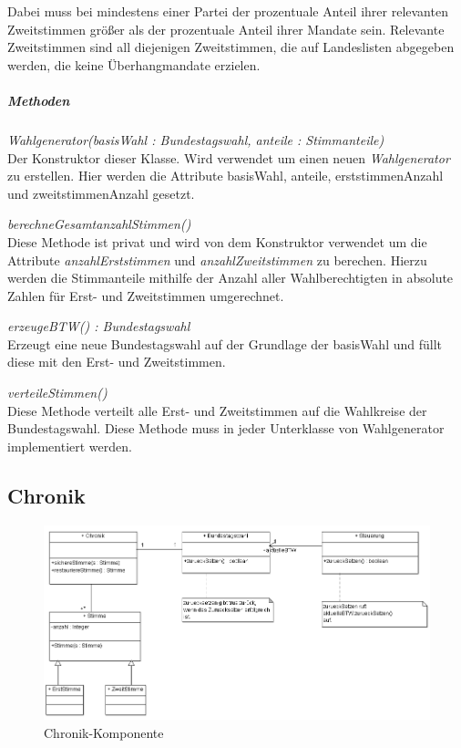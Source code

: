 \documentclass[12pt,a4paper,titlepage]{article}
\newcommand{\mymo}{\fontfamily{pcr}\selectfont \textit}
\begin{document}
Dabei muss bei mindestens einer Partei der prozentuale Anteil ihrer relevanten Zweitstimmen größer als der prozentuale Anteil ihrer Mandate sein. Relevante Zweitstimmen sind all diejenigen Zweitstimmen, die auf Landeslisten abgegeben werden, die keine Überhangmandate erzielen.

\subparagraph{Methoden}
\begin{description}
\item {\mymo{Wahlgenerator(basisWahl : Bundestagswahl, anteile : Stimmanteile)}} \\
Der Konstruktor dieser Klasse. Wird verwendet um einen neuen {\mymo{Wahlgenerator}} zu erstellen. Hier werden die Attribute basisWahl, anteile, erststimmenAnzahl und zweitstimmenAnzahl gesetzt.
\item {\mymo{berechneGesamtanzahlStimmen()}} \\
Diese Methode ist privat und wird von dem Konstruktor verwendet um die Attribute {\mymo{anzahlErststimmen}} und {\mymo{anzahlZweitstimmen}} zu berechen. Hierzu werden die Stimmanteile mithilfe der Anzahl aller Wahlberechtigten in absolute Zahlen für Erst- und Zweitstimmen umgerechnet.
\item {\mymo{erzeugeBTW() : Bundestagswahl}} \\
Erzeugt eine neue Bundestagswahl auf der Grundlage der basisWahl und füllt diese mit den Erst- und Zweitstimmen.
\item {\mymo{verteileStimmen()}} \\
Diese Methode verteilt alle Erst- und Zweitstimmen auf die Wahlkreise der Bundestagswahl. Diese Methode muss in jeder Unterklasse von Wahlgenerator implementiert werden.
\end{description}

\newpage
\subsection{Chronik}
\begin{figure}[!ht]
\includegraphics[scale=0.8]{Chronik_Ausschnitt} \caption{Chronik-Komponente} 
\end{figure}
\end{document}
